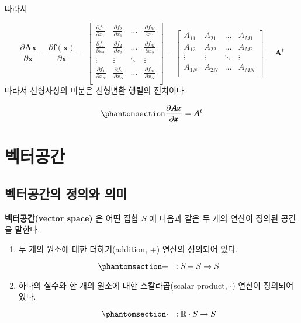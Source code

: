 \documentclass[
  11pt,
  a4paper,
  oneside]{scrbook}
\newcommand{\RR}{\mathbb{R}}
\newcommand{\pardifftwo}[2]{\frac{\partial #1}{\partial #2 }}
\theoremstyle{definition}
\theoremstyle{plain}
\theoremstyle{definition}
\theoremstyle{definition}
\theoremstyle{remark}
\begin{document}
따라서

\[
\pardifftwo{\pmb A \pmb x}{\pmb x}   = \pardifftwo{\pmb f (\pmb x)}{\pmb x} =
\begin{bmatrix}
\pardifftwo{f_1}{x_1} & \pardifftwo{f_2}{x_1} & \dots & \pardifftwo{f_M}{x_1} \\
\pardifftwo{f_1}{x_2} & \pardifftwo{f_2}{x_2} & \dots & \pardifftwo{f_M}{x_2} \\
\vdots & \vdots & \ddots & \vdots \\
\pardifftwo{f_1}{x_N} & \pardifftwo{f_2}{x_N} & \dots & \pardifftwo{f_M}{x_N} \\
\end{bmatrix} =
\begin{bmatrix}
A_{11} & A_{21} & \dots & A_{M1} \\
A_{12} & A_{22} & \dots & A_{M2} \\
\vdots & \vdots & \ddots & \vdots \\
A_{1N} & A_{2N} & \dots & A_{MN} \\
\end{bmatrix} = \pmb A^t
\] 따라서 선형사상의 미분은 선형변환 행렬의 전치이다.

\begin{equation}\phantomsection\label{eq-vec-diff-linear}{ \pardifftwo{\pmb A \pmb x}{\pmb x}  = \pmb A^t }\end{equation}

\chapter{벡터공간}\label{sec-vectorspace}

\section{벡터공간의 정의와
의미}\label{uxbca1uxd130uxacf5uxac04uxc758-uxc815uxc758uxc640-uxc758uxbbf8}

\textbf{벡터공간(vector space)} 은 어떤 집합 \(S\) 에 다음과 같은 두
개의 연산이 정의된 공간을 말한다.

\begin{enumerate}
\def\labelenumi{\arabic{enumi}.}
\item
  두 개의 원소에 대한 더하기(addition, \(+\)) 연산의 정의되어 있다.

  \begin{equation}\phantomsection\label{eq-vectorspace-def-1}{+ ~ ~ : S + S \rightarrow  S}\end{equation}
\item
  하나의 실수와 한 개의 원소에 대한 스칼라곱(scalar product, \(\cdot\))
  연산이 정의되어 있다.

  \begin{equation}\phantomsection\label{eq-vectorspace-def-2}{\cdot ~ ~ : \RR \cdot S \rightarrow  S}\end{equation}
\end{enumerate}
\end{document}
